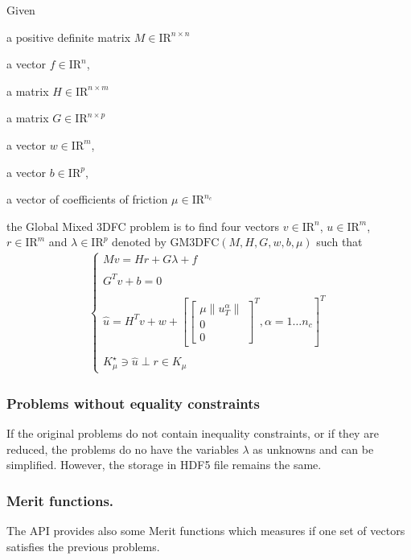 Given 
\begin{DoxyItemize}
\item a positive definite matrix ${M} \in {\mathrm{I\!R}}^{n \times n}$ 
\item a vector $ {f} \in {\mathrm{I\!R}}^n$, 
\item a matrix ${H} \in {\mathrm{I\!R}}^{n \times m}$ 
\item a matrix ${G} \in {\mathrm{I\!R}}^{n \times p}$ 
\item a vector $w \in {\mathrm{I\!R}}^{m}$, 
\item a vector $b \in {\mathrm{I\!R}}^{p}$, 
\item a vector of coefficients of friction $\mu \in {\mathrm{I\!R}}^{n_c}$ 
\end{DoxyItemize}the Global Mixed 3\+D\+F\+C problem is to find four vectors $ {v} \in {\mathrm{I\!R}}^n$, $u\in{\mathrm{I\!R}}^m$, $r\in {\mathrm{I\!R}}^m$ and $\lambda \in {\mathrm{I\!R}}^p$ denoted by $\mathrm{GM3DFC}(M,H,G,w,b,\mu)$ such that \begin{eqnarray*} \begin{cases} M v = {H} {r} + G\lambda + {f} \\ \\ G^T v +b =0 \\ \\ \hat u = H^T v + w +\left[ \left[\begin{array}{c} \mu \|u^\alpha_T\|\\ 0 \\ 0 \end{array}\right]^T, \alpha = 1 \ldots n_c \right]^T \\ \\ K^\star_{\mu} \ni {\hat u} \perp r \in K_{\mu} \end{cases} \end{eqnarray*} \hypertarget{index_without}{}\subsubsection{Problems without equality constraints}\label{index_without}
If the original problems do not contain inequality constraints, or if they are reduced, the problems do no have the variables $\lambda$ as unknowns and can be simplified. However, the storage in H\+D\+F5 file remains the same.\hypertarget{index_merit}{}\subsubsection{Merit functions.}\label{index_merit}
The A\+P\+I provides also some Merit functions which measures if one set of vectors satisfies the previous problems. 